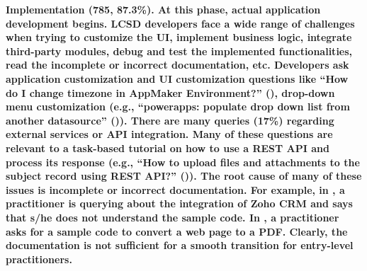 
\bf{Implementation (785, 87.3\%).} At this phase, actual application development begins. LCSD developers face a wide range of challenges when trying to customize the UI, implement business logic, integrate third-party modules, debug and test the implemented functionalities, read the incomplete or incorrect documentation, etc. Developers ask application customization and UI customization questions like ``How do I change timezone in AppMaker Environment?'' (), drop-down menu customization (e.g., ``powerapps: populate drop down list from another datasource'' ()). There are many queries (17\%) regarding external services or API integration. Many of these questions are relevant to a task-based tutorial on how to use a REST API and process its response (e.g., ``How to upload files and attachments to the subject record using REST API?'' ()). The root cause of many of these issues is incomplete or incorrect documentation. For example, in , a practitioner is querying about the integration of Zoho CRM and says that s/he does not understand the sample code. In , a practitioner asks for a sample code to convert a web page to a PDF. Clearly, the documentation is not sufficient for a smooth transition for entry-level practitioners.







